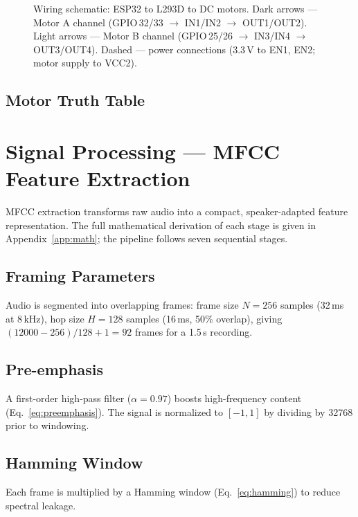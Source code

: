 \documentclass[conference]{IEEEtran}
\begin{document}
\begin{figure}[H]
\caption{Wiring schematic: ESP32 to L293D to DC motors.
  Dark arrows — Motor A channel (GPIO\,32/33 $\to$ IN1/IN2 $\to$ OUT1/OUT2).
  Light arrows — Motor B channel (GPIO\,25/26 $\to$ IN3/IN4 $\to$ OUT3/OUT4).
  Dashed — power connections (3.3\,V to EN1, EN2; motor supply to VCC2).}
\label{fig:wiring}
\end{figure}

\subsection{Motor Truth Table}



\section{Signal Processing --- MFCC Feature Extraction} \label{sec:mfcc}

MFCC extraction transforms raw audio into a compact, speaker-adapted
feature representation. The full mathematical derivation of each stage
is given in Appendix~\ref{app:math}; the pipeline follows seven
sequential stages.

\subsection{Framing Parameters}
Audio is segmented into overlapping frames: frame size $N = 256$ samples
(32\,ms at 8\,kHz), hop size $H = 128$ samples (16\,ms, 50\% overlap),
giving $(12000 - 256)/128 + 1 = 92$ frames for a 1.5\,s recording.

\subsection{Pre-emphasis}
A first-order high-pass filter ($\alpha = 0.97$) boosts high-frequency
content (Eq.~\ref{eq:preemphasis}). The signal is normalized to
$[-1, 1]$ by dividing by 32768 prior to windowing.

\subsection{Hamming Window}
Each frame is multiplied by a Hamming window (Eq.~\ref{eq:hamming})
to reduce spectral leakage.
\end{document}
